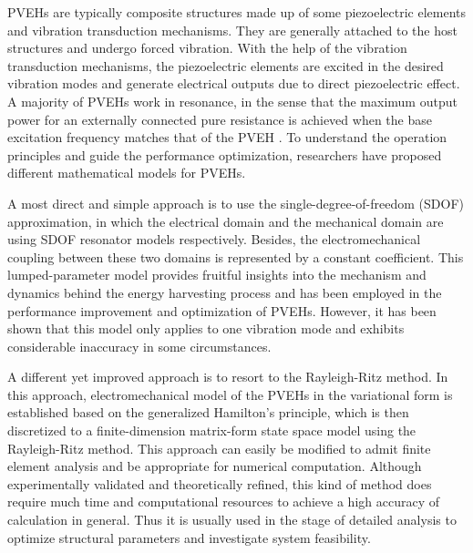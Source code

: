 \documentclass{svjour3}                     %
\begin{document}
PVEHs are typically composite structures made up of some piezoelectric elements and vibration transduction mechanisms. They are generally attached to the host structures and undergo forced vibration. With the help of the vibration transduction mechanisms, the piezoelectric elements are excited in the desired vibration modes and generate electrical outputs due to direct piezoelectric effect. A majority of PVEHs work in resonance, in the sense that the maximum output power for an externally connected pure resistance is achieved when the base excitation frequency matches that of the PVEH \cite{roundy2003study}. To understand the operation principles and guide the performance optimization, researchers have proposed different mathematical models for PVEHs. 

A most direct and simple approach is to use the single-degree-of-freedom (SDOF) approximation, in which the electrical domain and the mechanical domain are using SDOF resonator models respectively. Besides, the electromechanical coupling between these two domains is represented by a constant coefficient. \cite{roundy2003study,dutoit2005design} This lumped-parameter model provides fruitful insights into the mechanism and dynamics behind the energy harvesting process and has been employed in the performance improvement and optimization of PVEHs. \cite{stephen2006energy,cottone2009nonlinear} However, it has been shown that this model only applies to one vibration mode and exhibits considerable inaccuracy in some circumstances. \cite{erturk2008mechanical}

A different yet improved approach is to resort to the Rayleigh-Ritz method. In this approach, electromechanical model of the PVEHs in the variational form is established based on the generalized Hamilton's principle, \cite{crandall1968dynamics} which is then discretized to a finite-dimension matrix-form state space model using the Rayleigh-Ritz method. \cite{hagood1990modelling} This approach can easily be modified to admit finite element analysis and be appropriate for numerical computation. Although experimentally validated and theoretically refined, \cite{sodano2004estimation,lu2003modeling,chen2006analytical,ajitsaria2007modeling} this kind of method does require much time and computational resources to achieve a high accuracy of calculation in general. Thus it is usually used in the stage of detailed analysis to optimize structural parameters and investigate system feasibility. 
\end{document}
